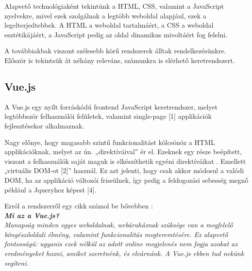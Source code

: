
Alapvető technológiaként tekintünk a HTML, CSS, valamint a JavaScript nyelvekre, mivel ezek szolgálnak a legtöbb weboldal alapjául, ezek a legelterjedtebbek. A HTML a weboldal tartalmáért, a CSS a weboldal esztétikájáért, a JavaScript pedig az oldal dinamikus mivoltáért fog felelni.

A továbbiakbak viszont szélesebb körű rendszerek álltak rendelkezésünkre. Először is tekintsük át néhány releváns, számunkra is elérhető keretrendszert.




\subsection{Vue.js}

A Vue.js egy nyílt forráskódú frontend JavaScript keretrendszer, melyet legtöbbször felhasználói felületek, valamint single-page [1] applikációk fejlesztésekor alkalmaznak.

Nagy előnye, hogy magasabb szintű funkcionalitást kölcsönöz a HTML applikációknak, melyet az ún. „direktíváival” ér el. Ezeknek egy része beépített, viszont a felhasználók saját maguk is elkészíthetik egyéni direktíváikat \cite{w3schoolsvue}. Emellett „virtuális DOM-ot [2]” használ. Ez azt jelenti, hogy csak akkor módosul a valódi DOM, ha az applikáció változói frissülnek, így pedig a feldogozási sebesség megnő például a Jqueryhez képest [4].

Erról a rendszerről egy cikk számol be bővebben \cite{vuecikk}:\\

\noindent\textit{\textbf{\large{Mi az a Vue.js?}}}\\

\textit{Manapság minden egyes weboldalnak, webáruháznak szüksége van a megfelelő böngészőoldali élmény, valamint funkcionalitás megteremtésére. Ez alapvető fontosságú: ugyanis ezek nélkül az adott online megjelenés nem fogja azokat az eredményeket hozni, amiket szeretnénk, és elvárnánk. A Vue.js ebben tud nekünk segíteni.}

